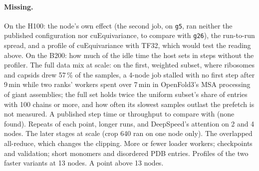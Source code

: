 \paragraph{Missing.} On the H100: the node's own effect (the second job, on \texttt{g5}, ran neither the published configuration nor cuEquivariance, to compare with \texttt{g26}), the run-to-run spread, and a profile of cuEquivariance with TF32, which would test the reading above. On the B200: how much of the idle time the host sets in steps without the profiler. The full data mix at scale: on the first, weighted subset, where ribosomes and capsids drew 57\,\% of the samples, a 4-node job stalled with no first step after 9\,min while two ranks' workers spent over 7\,min in OpenFold3's MSA processing of giant assemblies; the full set holds twice the uniform subset's share of entries with 100 chains or more, and how often its slowest samples outlast the prefetch is not measured. A published step time or throughput to compare with (none found). Repeats of each point, longer runs, and DeepSpeed's attention on 2 and 4 nodes. The later stages at scale (crop 640 ran on one node only). The overlapped all-reduce, which changes the clipping. More or fewer loader workers; checkpoints and validation; short monomers and disordered PDB entries. Profiles of the two faster variants at 13 nodes. A point above 13 nodes.

